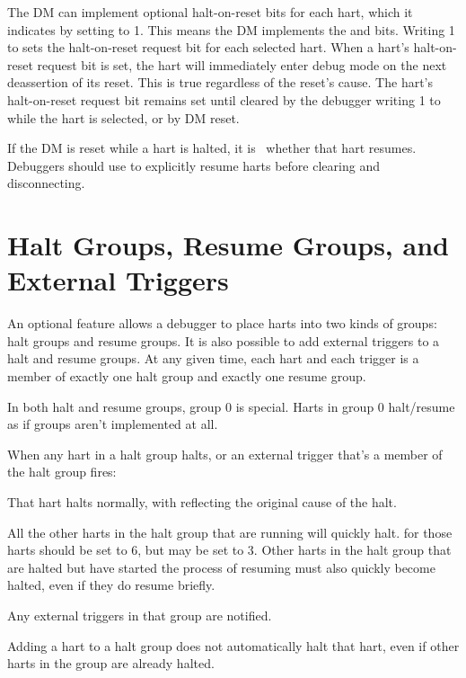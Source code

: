 The DM can implement optional halt-on-reset bits for each hart,
which it indicates by setting \FdmDmstatusHasresethaltreq to 1.
This means the DM implements the \FdmDmcontrolSetresethaltreq and \FdmDmcontrolClrresethaltreq bits.
Writing 1 to \FdmDmcontrolSetresethaltreq sets the halt-on-reset request bit for each
selected hart.
When a hart's halt-on-reset request bit is set, the hart will immediately enter
debug mode on the next deassertion of its reset. This is true regardless of
the reset's cause.
The hart's halt-on-reset request bit remains set
until cleared by the debugger writing 1 to \FdmDmcontrolClrresethaltreq
while the hart is selected, or by DM reset.

If the DM is reset while a hart is halted, it is \unspecified\ whether
that hart resumes.  Debuggers should use \FdmDmcontrolResumereq to
explicitly resume harts before clearing \FdmDmcontrolDmactive and
disconnecting.

\section{Halt Groups, Resume Groups, and External Triggers} \label{hrgroups}

An optional feature allows a debugger to place harts into two kinds of groups: halt
groups and resume groups.  It is also possible to add external triggers to a
halt and resume groups. At any given time, each hart and each trigger is a
member of exactly one halt group and exactly one resume group.

In both halt and resume groups, group 0 is special. Harts in group 0
halt/resume as if groups aren't implemented at all.

\begin{steps}{When any hart in a halt group halts, or an external trigger
    that's a member of the halt group fires:}
\item That hart halts normally, with \FcsrDcsrCause reflecting the original
    cause of the halt.
\item All the other harts in the halt group that are running will quickly halt.
    \FcsrDcsrCause for those harts should be set to 6, but may be set to 3.
    Other harts in the halt group that are halted but have started the process
    of resuming must also quickly become halted, even if they do resume briefly.
\item Any external triggers in that group are notified.
\end{steps}
Adding a hart to a halt group does not automatically halt that hart, even if
other harts in the group are already halted.

